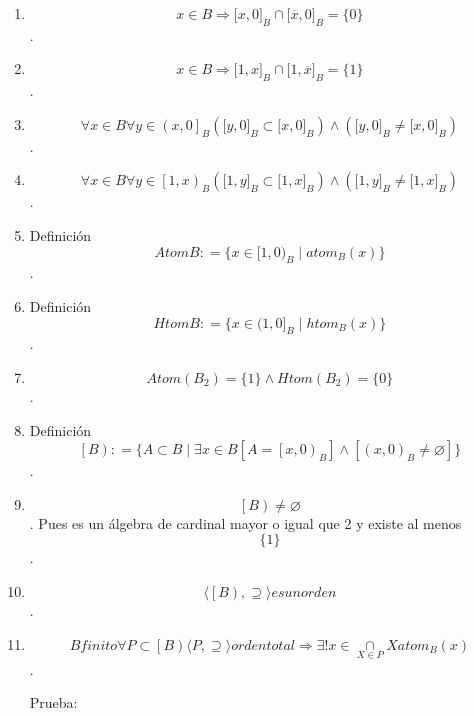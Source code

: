 \documentclass[
]{article}
\begin{document}
\begin{enumerate}
\begin{enumerate}
\begin{enumerate}
      \emph{\[{x \in B}\Rightarrow{{{\lbrack{x,0}\rbrack}_{B} \cap {\lbrack{1,x}\rbrack}_{B}} = {\{ x\}}}\]}.
    \item
      \emph{\[{x \in B}\Rightarrow{{{\lbrack{x,0}\rbrack}_{B} \cap {\lbrack{\overline{x},0}\rbrack}_{B}} = {\{ 0\}}}\]}.
    \item
      \emph{\[{x \in B}\Rightarrow{{{\lbrack{1,x}\rbrack}_{B} \cap {\lbrack{1,\overline{x}}\rbrack}_{B}} = {\{ 1\}}}\]}.
    \item
      \emph{\[\forall{x \in B}\forall{y \in \left( {x,0} \right\rbrack_{B}}{{({{\lbrack{y,0}\rbrack}_{B} \subset {\lbrack{x,0}\rbrack}_{B}})} \land {({{\lbrack{y,0}\rbrack}_{B} \neq {\lbrack{x,0}\rbrack}_{B}})}}\]}.
    \item
      \emph{\[\forall{x \in B}\forall{y \in \left\lbrack {1,x} \right)_{B}}{{({{\lbrack{1,y}\rbrack}_{B} \subset {\lbrack{1,x}\rbrack}_{B}})} \land {({{\lbrack{1,y}\rbrack}_{B} \neq {\lbrack{1,x}\rbrack}_{B}})}}\]}.
    \item
      Definición\emph{\[\mathit{Atom}B{: = {\{{{x \in \lbrack 1,0)_{B}} \mid \mathsf{\mathit{atom}}_{B}{(x)}}\}}}\]}.
    \item
      Definición\emph{\[\mathit{Htom}B{: = {\{{{x \in (1,0\rbrack_{B}} \mid \mathsf{\mathit{htom}}_{B}{(x)}}\}}}\]}.
    \item
      \emph{\[\mathit{Atom}{{(B_{2})} = {{\{ 1\}} \land \mathit{Htom}}}{{(B_{2})} = {\{ 0\}}}\]}.
    \item
      Definición
      \emph{\[\left\lbrack B \right){: = {\{{{A \subset B} \mid \exists{x \in B}{\left\lbrack {A = \left\lbrack {x,0} \right)_{B}} \right\rbrack \land \left\lbrack {\left( {x,0} \right)_{B} \neq \varnothing} \right\rbrack}}\}}}\]}.
    \item
      \emph{\[\left\lbrack B \right) \neq \varnothing\]}. Pues es un
      álgebra de cardinal mayor o igual que 2 y existe al menos
      \[\{ 1\}\].
    \item
      \emph{\[{\langle{\left\lbrack B \right), \supseteq}\rangle}\mathit{es}\mathit{un}\mathit{orden}\]}.
    \item
      \emph{\[B\mathit{finito}\forall{P \subset \left\lbrack B \right)}{\langle{P, \supseteq}\rangle}\mathit{orden}\mathit{total}\Rightarrow\exists!{x \in \underset{X \in P}{\cap}}X\mathsf{\mathit{atom}}_{B}{(x)}\]}.

      Prueba:


\end{enumerate}
\end{enumerate}
\end{enumerate}
\end{document}
